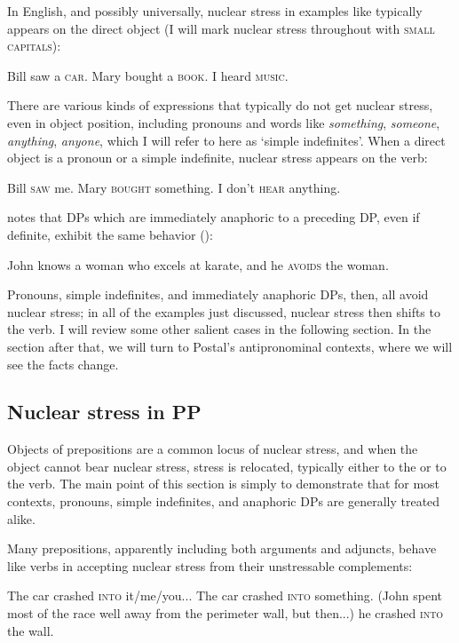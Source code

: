 \documentclass[output=paper]{LSP/langsci}
\begin{document}
In English, and possibly universally, nuclear stress in examples like  typically appears on the direct object (I will mark nuclear stress throughout with \textsc{small capitals}):


\ea%
\label{ex:richards:2}
\ea  Bill saw a \textsc{car}.
\ex   Mary bought a \textsc{book}.
\ex  I heard \textsc{music}.
\z
\z


There are various kinds of expressions that typically do not get nuclear stress, even in object position, including pronouns and words like \textit{something}, \textit{someone}, \textit{anything}, \textit{anyone}, which I will refer to here as `simple indefinites'.  When a direct object is a pronoun or a simple indefinite, nuclear stress appears on the verb:


\ea%
\label{ex:richards:3}
\ea  Bill \textsc{saw} me.
\ex  Mary \textsc{bought} something.
\ex  I don't \textsc{hear} anything.
\z
\z


\citet{Bresnan1971} notes that DPs which are immediately anaphoric to a preceding DP, even if definite, exhibit the same behavior (\citealt[258]{Bresnan1971}):

\ea%
\label{ex:richards:4}
  	  John knows a woman who excels at karate, and he \textsc{avoids} the woman.
\z

  Pronouns, simple indefinites, and immediately anaphoric DPs, then, all avoid nuclear stress; in all of the examples just discussed, nuclear stress then shifts to the verb.  I will review some other salient cases in the following section.  In the section after that, we will turn to Postal's antipronominal contexts, where we will see the facts change.

\subsection{Nuclear stress in PP}\label{sec:richards:2.1}

Objects of prepositions are a common locus of nuclear stress, and when the object cannot bear nuclear stress, stress is relocated, typically either to the  or to the verb.  The main  point of this section is simply to demonstrate that for most contexts, pronouns, simple indefinites, and anaphoric DPs are generally treated alike.  

  Many prepositions, apparently including both arguments and adjuncts, behave like verbs in accepting nuclear stress from their unstressable complements:


\ea%
\label{ex:richards:5}
\ea  The car crashed \textsc{into} it/me/you...
\ex  The car crashed \textsc{into} something.
\ex  (John spent most of the race well away from the perimeter wall, but then...)    he crashed \textsc{into} the wall.
\z
\z
\end{document}
